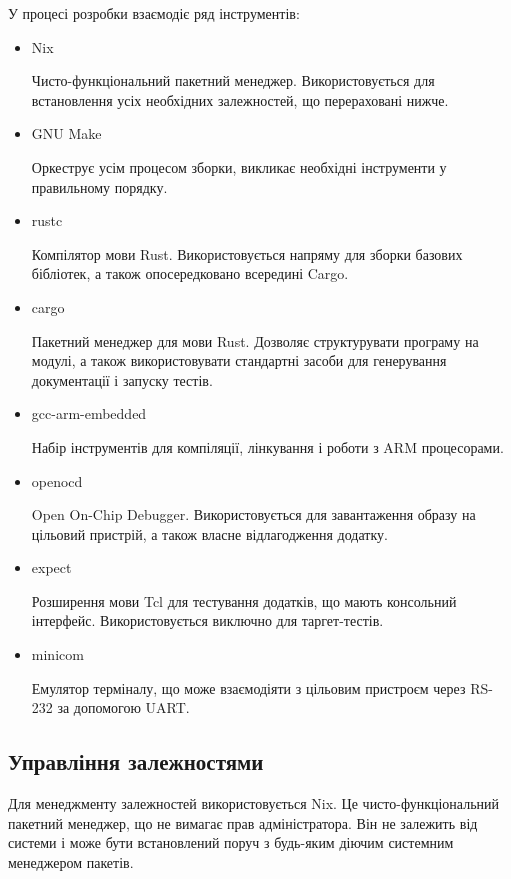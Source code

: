 \documentclass[oneside,14pt,a4paper,final]{myextreport}
\begin{document}
У процесі розробки взаємодіє ряд інструментів:
\begin{itemize}%
\item Nix\cite{nix}

  Чисто-функціональний пакетний менеджер. Використовується для встановлення усіх необхідних залежностей, що перераховані нижче.

\item GNU Make\cite{gnu-make}

  Оркеструє усім процесом зборки, викликає необхідні інструменти у правильному порядку.

\item rustc

  Компілятор мови Rust. Використовується напряму для зборки базових бібліотек, а також опосередковано всередині Cargo.

\item cargo\cite{cargo}

  Пакетний менеджер для мови Rust. Дозволяє структурувати програму на модулі, а також використовувати стандартні засоби для генерування документації і запуску тестів.

\item gcc-arm-embedded\cite{gcc-arm-embedded}

  Набір інструментів для компіляції, лінкування і роботи з ARM процесорами.

\item openocd\cite{openocd}

  Open On-Chip Debugger. Використовується для завантаження образу на цільовий пристрій, а також власне відлагодження додатку.

\item expect\cite{expect}

  Розширення мови Tcl\cite{tcl} для тестування додатків, що мають консольний інтерфейс. Використовується виключно для таргет-тестів.

\item minicom\cite{minicom}

  Емулятор терміналу, що може взаємодіяти з цільовим пристроєм через RS-232 за допомогою UART.
\end{itemize}

\subsection{Управління залежностями}

Для менеджменту залежностей використовується Nix. Це чисто-функціональний пакетний менеджер, що не вимагає прав адміністратора. Він не залежить від системи і може бути встановлений поруч з будь-яким діючим системним менеджером пакетів.
\end{document}
